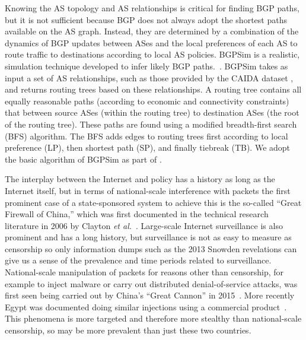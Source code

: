 \par Knowing the AS topology and AS relationships is critical for finding BGP paths, but it is not sufficient because BGP does not always adopt
the shortest paths available on the
AS graph. Instead, they are determined by a combination of the dynamics of
BGP updates between ASes and the local preferences of each AS to route traffic
to destinations according to local AS policies.
BGPSim is a realistic, simulation technique developed to infer likely BGP paths.~\cite{quicksand}. BGPSim takes as input a set of AS
relationships, such as those provided by the CAIDA dataset
\cite{CAIDA}, and returns routing trees based on these
relationships. A routing tree contains all
equally reasonable paths (according to economic and connectivity constraints) that between source ASes (within the routing tree) to destination ASes (the
root of the routing tree). These paths are found using a modified breadth-first
search (BFS) algorithm. The BFS adds edges to routing trees first
according to local preference (LP), then shortest path (SP), and
finally tiebreak (TB).
We adopt the basic algorithm of BGPSim
as part of \toolname{}.

The interplay between the Internet and policy has a history as long as the
Internet itself, but in terms of national-scale interference with packets the
first prominent case of a state-sponsored system to achieve this is the
so-called ``Great Firewall of China,'' which was first documented in the
technical research literature in 2006 by Clayton \emph{et
al.}~\cite{Clayton:2006:IGF:2166520.2166523}. Large-scale Internet surveillance is also prominent and has a
long history, but surveillance is not as easy to measure as censorship so only
information dumps such as the 2013 Snowden revelations can give us a sense of
the prevalence and time periods related to surveillance.  National-scale
manipulation of packets for reasons other than censorship, for example to inject
malware or carry out distributed denial-of-service attacks, was first seen being
carried out by China's ``Great Cannon'' in 2015~\cite{badtraffic}.  More
recently Egypt was documented doing similar injections using a commercial
product~\cite{191996}.  This phenomena is more targeted and therefore more
stealthy than national-scale censorship, so may be more prevalent than just
these two countries.
